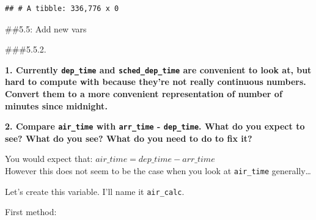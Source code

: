 \documentclass[]{book}
\newenvironment{Shaded}{\begin{snugshade}}{\end{snugshade}}
\newcommand{\CommentTok}[1]{\textcolor[rgb]{0.56,0.35,0.01}{\textit{#1}}}
\newcommand{\ControlFlowTok}[1]{\textcolor[rgb]{0.13,0.29,0.53}{\textbf{#1}}}
\newcommand{\DataTypeTok}[1]{\textcolor[rgb]{0.13,0.29,0.53}{#1}}
\newcommand{\DecValTok}[1]{\textcolor[rgb]{0.00,0.00,0.81}{#1}}
\newcommand{\KeywordTok}[1]{\textcolor[rgb]{0.13,0.29,0.53}{\textbf{#1}}}
\newcommand{\NormalTok}[1]{#1}
\newcommand{\OperatorTok}[1]{\textcolor[rgb]{0.81,0.36,0.00}{\textbf{#1}}}
\newcommand{\StringTok}[1]{\textcolor[rgb]{0.31,0.60,0.02}{#1}}
\theoremstyle{definition}
\theoremstyle{definition}
\theoremstyle{definition}
\theoremstyle{remark}
\begin{document}
\begin{verbatim}
## # A tibble: 336,776 x 0
\end{verbatim}

\#\#5.5: Add new vars

\#\#\#5.5.2.

\textbf{1. Currently \texttt{dep\_time} and \texttt{sched\_dep\_time}
are convenient to look at, but hard to compute with because they're not
really continuous numbers. Convert them to a more convenient
representation of number of minutes since midnight.}

\begin{Shaded}
\end{Shaded}

\begin{Shaded}
\end{Shaded}

\textbf{2. Compare \texttt{air\_time} with \texttt{arr\_time} -
\texttt{dep\_time}. What do you expect to see? What do you see? What do
you need to do to fix it?}

You would expect that: \(air\_time = dep\_time - arr\_time\)\\
However this does not seem to be the case when you look at
\texttt{air\_time} generally\ldots{}

Let's create this variable. I'll name it \texttt{air\_calc}.

First method:
\end{document}
